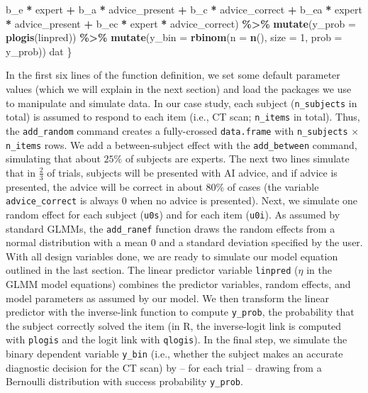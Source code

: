 \documentclass[
  man,floatsintext]{apa6}
\newenvironment{Shaded}{\begin{snugshade}}{\end{snugshade}}
\newcommand{\AttributeTok}[1]{\textcolor[rgb]{0.13,0.29,0.53}{#1}}
\newcommand{\DecValTok}[1]{\textcolor[rgb]{0.00,0.00,0.81}{#1}}
\newcommand{\FunctionTok}[1]{\textcolor[rgb]{0.13,0.29,0.53}{\textbf{#1}}}
\newcommand{\NormalTok}[1]{#1}
\newcommand{\SpecialCharTok}[1]{\textcolor[rgb]{0.81,0.36,0.00}{\textbf{#1}}}
\begin{document}
\begin{Shaded}
\begin{Highlighting}[]
\NormalTok{        b\_e }\SpecialCharTok{*}\NormalTok{ expert }\SpecialCharTok{+}\NormalTok{ b\_a }\SpecialCharTok{*}\NormalTok{ advice\_present }\SpecialCharTok{+}\NormalTok{ b\_c }\SpecialCharTok{*}\NormalTok{ advice\_correct }\SpecialCharTok{+}
\NormalTok{        b\_ea }\SpecialCharTok{*}\NormalTok{ expert }\SpecialCharTok{*}\NormalTok{ advice\_present }\SpecialCharTok{+}\NormalTok{ b\_ec }\SpecialCharTok{*}\NormalTok{ expert }\SpecialCharTok{*}\NormalTok{ advice\_correct) }\SpecialCharTok{\%\textgreater{}\%}
    \FunctionTok{mutate}\NormalTok{(}\AttributeTok{y\_prob =} \FunctionTok{plogis}\NormalTok{(linpred)) }\SpecialCharTok{\%\textgreater{}\%}
    \FunctionTok{mutate}\NormalTok{(}\AttributeTok{y\_bin =} \FunctionTok{rbinom}\NormalTok{(}\AttributeTok{n =} \FunctionTok{n}\NormalTok{(), }\AttributeTok{size =} \DecValTok{1}\NormalTok{, }\AttributeTok{prob =}\NormalTok{ y\_prob))}
\NormalTok{  dat}
\NormalTok{\}}
\end{Highlighting}
\end{Shaded}

In the first six lines of the function definition, we set some default parameter values (which we will explain in the next section) and load the packages we use to manipulate and simulate data.
In our case study, each subject (\texttt{n\_subjects} in total) is assumed to respond to each item (i.e., CT scan; \texttt{n\_items} in total). Thus, the \texttt{add\_random} command creates a fully-crossed \texttt{data.frame} with \texttt{n\_subjects} \(\times\) \texttt{n\_items} rows.
We add a between-subject effect with the \texttt{add\_between} command, simulating that about \(25\%\) of subjects are experts.
The next two lines simulate that in \(\frac{2}{3}\) of trials, subjects will be presented with AI advice, and if advice is presented, the advice will be correct in about \(80\%\) of cases (the variable \texttt{advice\_correct} is always 0 when no advice is presented). Next, we simulate one random effect for each subject (\texttt{u0s}) and for each item (\texttt{u0i}).
As assumed by standard GLMMs, the \texttt{add\_ranef} function draws the random effects from a normal distribution with a mean 0 and a standard deviation specified by the user.
With all design variables done, we are ready to simulate our model equation outlined in the last section.
The linear predictor variable \texttt{linpred} (\(\eta\) in the GLMM model equations) combines the predictor variables, random effects, and model parameters as assumed by our model.
We then transform the linear predictor with the inverse-link function to compute \texttt{y\_prob}, the probability that the subject correctly solved the item (in R, the inverse-logit link is computed with \texttt{plogis} and the logit link with \texttt{qlogis}).
In the final step, we simulate the binary dependent variable \texttt{y\_bin} (i.e., whether the subject makes an accurate diagnostic decision for the CT scan) by -- for each trial -- drawing from a Bernoulli distribution with success probability \texttt{y\_prob}.
\end{document}
